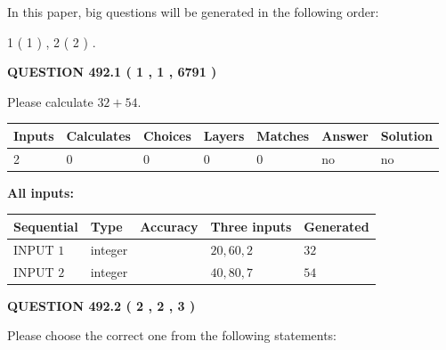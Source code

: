 \documentclass[12pt]{article}
\begin{document}
\vspace{0.2in}
   
In this paper, big questions will be generated in the following order: 
   
   
   1 ( 1 )
 ,
   2 ( 2 )
 .
  
\vspace{0.2in}
  
{\textbf{\Large{QUESTION
492.1 
 ( 1 , 1 , 6791 )
}}}
  
  
 
Please calculate $ %
32 +  %
54 $.
 
 
   
   
   
   
\noindent\begin{tabular}{|l|l|l|l|l|l|l|}
 \hline
Inputs & Calculates & Choices & Layers & Matches & Answer & Solution \\ \hline
 2  & 
 0  & 
 0
  & 
 0  & 
 0  & 
  no & 
  no 
  \\ \hline
 \end{tabular}
   
   
   
   
\noindent{}
   
   
   
   
\noindent\vspace{0.1in}\hspace{-0.08in} {\textbf{\Large{All inputs: }}}
   
   
  
  
\noindent\begin{tabular}{|l|l|l|l|l|}
\hline
 Sequential & Type & Accuracy & Three inputs & Generated \\ 
\hline
 
 
  INPUT $  1 $ & integer &  & $
 20
 , 
 60
 , 
 2
 $ & $ 32 $ 
 \\  \hline  
 
 
  INPUT $  2 $ & integer &  & $
 40
 , 
 80
 , 
 7
 $ & $ 54 $ 
 \\  \hline  
 \end{tabular}
   
   
  
\vspace{0.2in}
  
{\textbf{\Large{QUESTION
492.2 
 ( 2 , 2 , 3 )
}}}
  
  
Please choose the correct one from the following statements:
 
\end{document}
